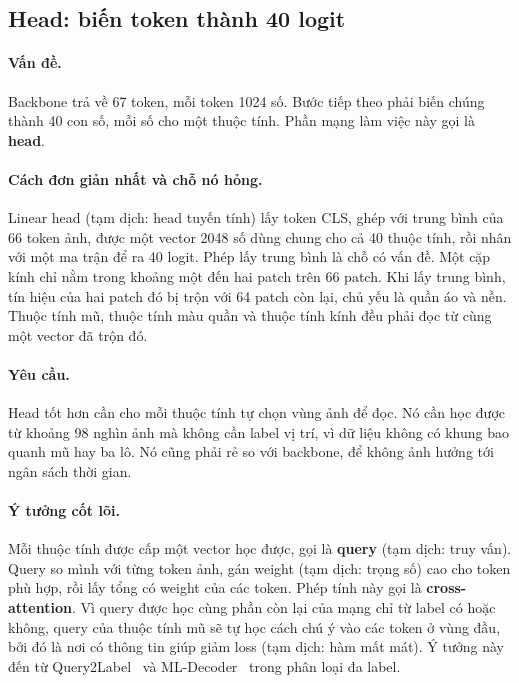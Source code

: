 \documentclass[11pt,a4paper]{article}
\begin{document}
\subsection{Head: biến token thành 40 logit}
\label{sec:head}

\paragraph{Vấn đề.} Backbone trả về 67 token, mỗi token 1024 số. Bước tiếp theo phải biến chúng thành 40 con số, mỗi số cho một thuộc tính. Phần mạng làm việc này gọi là \textbf{head}.

\paragraph{Cách đơn giản nhất và chỗ nó hỏng.} Linear head (tạm dịch: head tuyến tính) lấy token CLS, ghép với trung bình của 66 token ảnh, được một vector 2048 số dùng chung cho cả 40 thuộc tính, rồi nhân với một ma trận để ra 40 logit. Phép lấy trung bình là chỗ có vấn đề. Một cặp kính chỉ nằm trong khoảng một đến hai patch trên 66 patch. Khi lấy trung bình, tín hiệu của hai patch đó bị trộn với 64 patch còn lại, chủ yếu là quần áo và nền. Thuộc tính mũ, thuộc tính màu quần và thuộc tính kính đều phải đọc từ cùng một vector đã trộn đó.

\paragraph{Yêu cầu.} Head tốt hơn cần cho mỗi thuộc tính tự chọn vùng ảnh để đọc. Nó cần học được từ khoảng 98 nghìn ảnh mà không cần label vị trí, vì dữ liệu không có khung bao quanh mũ hay ba lô. Nó cũng phải rẻ so với backbone, để không ảnh hưởng tới ngân sách thời gian.

\paragraph{Ý tưởng cốt lõi.} Mỗi thuộc tính được cấp một vector học được, gọi là \textbf{query} (tạm dịch: truy vấn). Query so mình với từng token ảnh, gán weight (tạm dịch: trọng số) cao cho token phù hợp, rồi lấy tổng có weight của các token. Phép tính này gọi là \textbf{cross-attention}. Vì query được học cùng phần còn lại của mạng chỉ từ label có hoặc không, query của thuộc tính mũ sẽ tự học cách chú ý vào các token ở vùng đầu, bởi đó là nơi có thông tin giúp giảm loss (tạm dịch: hàm mất mát). Ý tưởng này đến từ Query2Label~\cite{q2l} và ML-Decoder~\cite{mldecoder} trong phân loại đa label.
\end{document}
